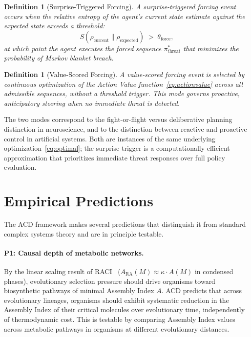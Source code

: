 \documentclass[11pt,a4paper]{article}
\newtheorem{definition}[theorem]{Definition}
\theoremstyle{remark}
\newcommand{\ARA}{A_{\mathrm{RA}}}
\begin{document}
\begin{definition}[Surprise-Triggered Forcing]
A surprise-triggered forcing event occurs when the relative entropy of the
agent's current state estimate against the expected state exceeds a threshold:
\begin{equation}
  S(\rho_{\mathrm{current}} \| \rho_{\mathrm{expected}}) \;>\; \theta_{\mathrm{force}},
\end{equation}
at which point the agent executes the forced sequence $\pi^*_{\mathrm{threat}}$
that minimizes the probability of Markov blanket breach.
\end{definition}

\begin{definition}[Value-Scored Forcing]
A value-scored forcing event is selected by continuous optimization of the
Action Value function~\eqref{eq:actionvalue} across all admissible sequences,
without a threshold trigger. This mode governs proactive, anticipatory steering
when no immediate threat is detected.
\end{definition}

The two modes correspond to the fight-or-flight versus deliberative planning
distinction in neuroscience, and to the distinction between reactive and
proactive control in artificial systems. Both are instances of the same underlying
optimization~\eqref{eq:optimal}; the surprise trigger is a computationally efficient
approximation that prioritizes immediate threat responses over full policy
evaluation.

\section{Empirical Predictions}
\label{sec:predictions}

The ACD framework makes several predictions that distinguish it from standard
complex systems theory and are in principle testable.

\paragraph{P1: Causal depth of metabolic networks.}
By the linear scaling result of RACI~\citep{Sandeman2026c} ($\ARA(M) \approx
\kappa \cdot A(M)$ in condensed phases), evolutionary selection pressure should
drive organisms toward biosynthetic pathways of minimal Assembly Index $A$.
ACD predicts that across evolutionary lineages, organisms should exhibit
systematic reduction in the Assembly Index of their critical molecules over
evolutionary time, independently of thermodynamic cost. This is testable by
comparing Assembly Index values across metabolic pathways in organisms at
different evolutionary distances.
\end{document}
